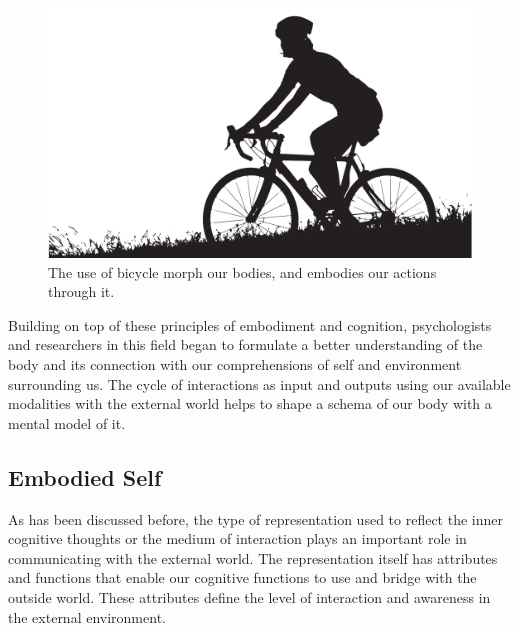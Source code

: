 \begin{figure}[htpb]
  \centering
    \centerline{\includegraphics[width=0.8\linewidth]{figures/intro/Bicycle.pdf}}
  \captionsetup{justification=centering}
  \caption{The use of bicycle morph our bodies, and embodies our actions through it.}
  \label{fig:intro-bicycle}
\end{figure}

Building on top of these principles of embodiment and cognition, psychologists and researchers in this field \cite{marcel1995body,gallagher2006body,pfeifer2006body,blanke2009full} began to formulate a better understanding of the body and its connection with our comprehensions of self and environment surrounding us. The cycle of interactions as input and outputs using our available modalities with the external world helps to shape a schema of our body with a mental model of it. 


\subsection{Embodied Self}

As has been discussed before, the type of representation used to reflect the inner cognitive thoughts or the medium of interaction plays an important role in communicating with the external world. The representation itself has attributes and functions that enable our cognitive functions to use and bridge with the outside world. These attributes define the level of interaction and awareness in the external environment.

